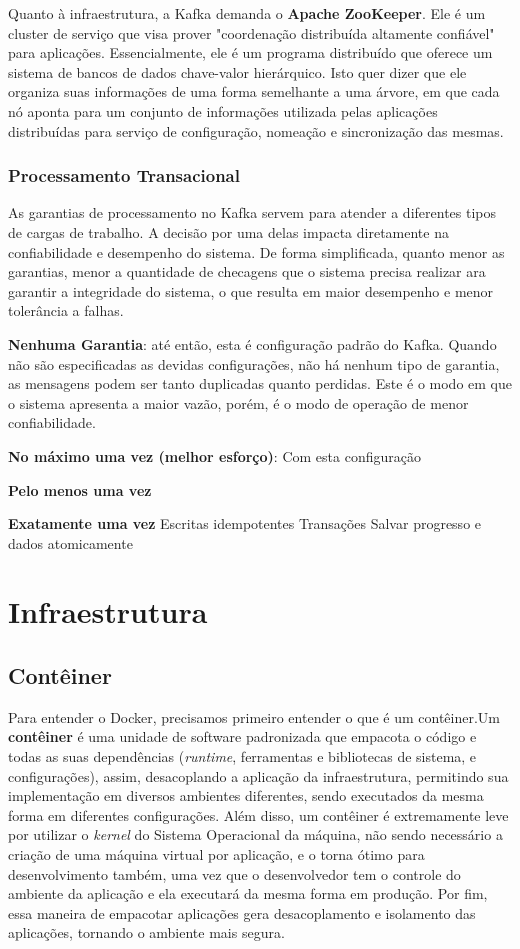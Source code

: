 \documentclass[12pt]{article}
\begin{document}
Quanto à infraestrutura, a Kafka demanda o \textbf{Apache ZooKeeper}. Ele é um cluster de serviço que visa prover "coordenação distribuída altamente confiável" para aplicações. Essencialmente, ele é um programa distribuído que oferece um sistema de bancos de dados chave-valor hierárquico. Isto quer dizer que ele organiza suas informações de uma forma semelhante a uma árvore, em que cada nó aponta para um conjunto de informações utilizada pelas aplicações distribuídas para serviço de configuração, nomeação e sincronização das mesmas.

\subsubsection{Processamento Transacional}

As garantias de processamento no Kafka servem para atender a diferentes tipos de cargas de trabalho. A decisão por uma delas impacta diretamente na confiabilidade e desempenho do sistema. De forma simplificada, quanto menor as garantias, menor a quantidade de checagens que o sistema precisa realizar ara garantir a integridade do sistema, o que resulta em maior desempenho e menor tolerância a falhas.

\textbf{Nenhuma Garantia}: até então, esta é  configuração padrão do Kafka. Quando não são especificadas as devidas configurações, não há nenhum tipo de garantia, as mensagens podem ser tanto duplicadas quanto perdidas. Este é o modo em que o sistema apresenta a maior vazão, porém, é o modo de operação de menor confiabilidade.

\textbf{No máximo uma vez (melhor esforço)}: Com esta configuração

\textbf{Pelo menos uma vez}

\textbf{Exatamente uma vez}
Escritas idempotentes
Transações
Salvar progresso e dados atomicamente


\section{Infraestrutura}
\subsection{Contêiner}
Para entender o Docker, precisamos primeiro entender o que é um contêiner.Um \textbf{contêiner} é uma unidade de software padronizada que empacota o código e todas as suas dependências (\textit{runtime}, ferramentas e bibliotecas de sistema, e configurações), assim, desacoplando a aplicação da infraestrutura, permitindo sua implementação em diversos ambientes diferentes, sendo executados da mesma forma em diferentes configurações. Além disso, um contêiner é extremamente leve por utilizar o \textit{kernel} do Sistema Operacional da máquina, não sendo necessário a criação de uma máquina virtual por aplicação, e o torna ótimo para desenvolvimento também, uma vez que o desenvolvedor tem o controle do ambiente da aplicação e ela executará da mesma forma em produção. Por fim, essa maneira de empacotar aplicações gera desacoplamento e isolamento das aplicações, tornando o ambiente mais segura.
\end{document}
